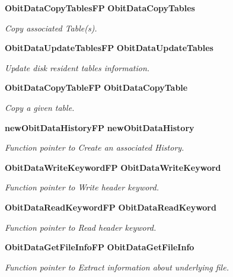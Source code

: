 \begin{CompactItemize}
{\bf Obit\-Data\-Copy\-Tables\-FP} {\bf Obit\-Data\-Copy\-Tables}
\begin{CompactList}\small\item\em Copy associated Table(s). \item\end{CompactList}\item 
{\bf Obit\-Data\-Update\-Tables\-FP} {\bf Obit\-Data\-Update\-Tables}
\begin{CompactList}\small\item\em Update disk resident tables information. \item\end{CompactList}\item 
{\bf Obit\-Data\-Copy\-Table\-FP} {\bf Obit\-Data\-Copy\-Table}
\begin{CompactList}\small\item\em Copy a given table. \item\end{CompactList}\item 
{\bf new\-Obit\-Data\-History\-FP} {\bf new\-Obit\-Data\-History}
\begin{CompactList}\small\item\em Function pointer to Create an associated History. \item\end{CompactList}\item 
{\bf Obit\-Data\-Write\-Keyword\-FP} {\bf Obit\-Data\-Write\-Keyword}
\begin{CompactList}\small\item\em Function pointer to Write header keyword. \item\end{CompactList}\item 
{\bf Obit\-Data\-Read\-Keyword\-FP} {\bf Obit\-Data\-Read\-Keyword}
\begin{CompactList}\small\item\em Function pointer to Read header keyword. \item\end{CompactList}\item 
{\bf Obit\-Data\-Get\-File\-Info\-FP} {\bf Obit\-Data\-Get\-File\-Info}
\begin{CompactList}\small\item\em Function pointer to Extract information about underlying file. \item\end{CompactList}\item 

\end{CompactItemize}
